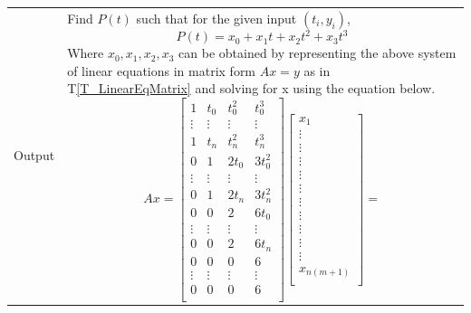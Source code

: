\documentclass[12pt]{article}
\newcommand{\colAwidth}{0.13\textwidth}
\newcommand{\colBwidth}{0.82\textwidth}
\newcommand{\tref}[1]{T\ref{#1}}
\begin{document}
\begin{minipage}{\textwidth}
\begin{tabular}{| p{\colAwidth} | p{\colBwidth}|}
		Output
		&Find $P(t)$ such that for the given input $(t_i,y_i)$,
		\begin{equation*}
		P(t) = x_0 + x_1 t + x_2 t^{2} + x_3 t^{3}
		\end{equation*}
		Where $x_0, x_1, x_2, x_3$ can be obtained by representing the above system of linear equations in matrix form $Ax = y$ as in \tref{T_LinearEqMatrix} and solving for x using the equation below.
		\begin{equation*}
		Ax = \begin{bmatrix}
		1          & t_0       & t_0 ^{2}         & t_0 ^{3}         \\
		\vdots     & \vdots    & \vdots           & \vdots            \\
		1          & t_n       & t_n ^{2}         & t_n ^{3}          \\
		0          & 1         & 2 t_0            & 3 t_0 ^{2}         \\
		\vdots     & \vdots    & \vdots           & \vdots            \\
		0          & 1         & 2 t_n            & 3 t_n ^{2}          \\
		0          & 0         & 2                & 6 t_0              \\
		\vdots     & \vdots    & \vdots           & \vdots            \\
		0          & 0         & 2                & 6 t_n           \\
		0          & 0         & 0                & 6                 \\
		\vdots     & \vdots    & \vdots           & \vdots            \\
		0          & 0         & 0                & 6               \\
		\end{bmatrix}
		\begin{bmatrix}
		x_1  \\
		\vdots \\
		\vdots \\
		\vdots \\
		\vdots \\
		\vdots \\
		\vdots \\
		\vdots \\
		\vdots \\
		\vdots \\
		\vdots \\
		x_{n(m+1)} \\
		\end{bmatrix} = 

\end{equation*}
\end{tabular}
\end{minipage}
\end{document}
